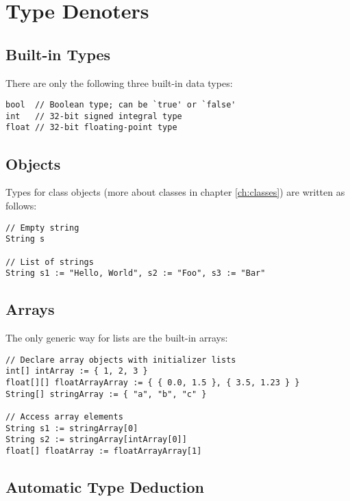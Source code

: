 \documentclass{report}
\begin{document}
\section{Type Denoters}

\subsection{Built-in Types}

There are only the following three built-in data types:
\begin{lstlisting}
bool  // Boolean type; can be `true' or `false'
int   // 32-bit signed integral type
float // 32-bit floating-point type
\end{lstlisting}

\subsection{Objects}

Types for class objects (more about classes in chapter \ref{ch:classes}) are written as follows:
\begin{lstlisting}
// Empty string
String s

// List of strings
String s1 := "Hello, World", s2 := "Foo", s3 := "Bar"
\end{lstlisting}

\subsection{Arrays}

The only generic way for lists are the built-in arrays:
\begin{lstlisting}
// Declare array objects with initializer lists
int[] intArray := { 1, 2, 3 }
float[][] floatArrayArray := { { 0.0, 1.5 }, { 3.5, 1.23 } }
String[] stringArray := { "a", "b", "c" }

// Access array elements
String s1 := stringArray[0]
String s2 := stringArray[intArray[0]]
float[] floatArray := floatArrayArray[1]
\end{lstlisting}

\subsection{Automatic Type Deduction}
\end{document}
